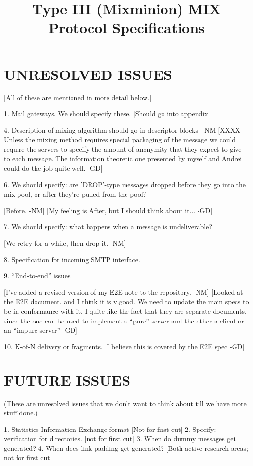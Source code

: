 \title{Type III (Mixminion) MIX Protocol Specifications}

\section{UNRESOLVED ISSUES}

[All of these are mentioned in more detail below.]

1. Mail gateways. We should specify these.
   [Should go into appendix]

4. Description of mixing algorithm should go in descriptor blocks. -NM
   [XXXX Unless the mixing method requires special packaging of the message 
         we could require the servers to specify the amount of anonymity that
 	 they expect to give to each message. The information theoretic one
 	 presented by myself and Andrei could do the job quite well. -GD]

6. We should specify: are 'DROP'-type messages dropped before they go
    into the mix pool, or after they're pulled from the pool?

  [Before. -NM]
  [My feeling is After, but I should think about it... -GD]

7. We should specify: what happens when a message is undeliverable?

  [We retry for a while, then drop it. -NM]

8. Specification for incoming SMTP interface.

9. ``End-to-end'' issues

  [I've added a revised version of my E2E note to the repository. -NM]
  [Looked at the E2E document, and I think it is v.good. We need to update 
   the main specs to be in conformance with it. I quite like the fact that 
   they are separate documents, since the one can be used to implement a
   ``pure'' server and the other a client or an ``impure server'' -GD]

10. K-of-N delivery or fragments.
    [I believe this is covered by the E2E spec -GD]

\section{FUTURE ISSUES}
(These are unresolved issues that we don't want to think about till we
have more stuff done.)

1. Statistics Information Exchange format
   [Not for first cut]
2. Specify: verification for directories.
	[not for first cut]
3. When do dummy messages get generated?
4. When does link padding get generated?
   [Both active research areas; not for first cut]

